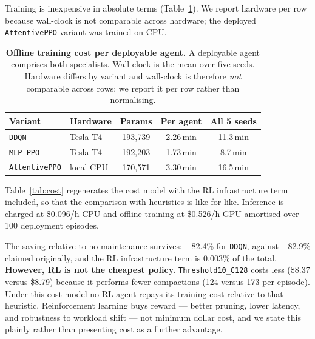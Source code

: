 \documentclass[fleqn,10pt]{wlscirep}
\newcommand{\attentive}{\texttt{AttentivePPO}}
\newcommand{\mlpppo}{\texttt{MLP-PPO}}
\newcommand{\ddqn}{\texttt{DDQN}}
\begin{document}
Training is inexpensive in absolute terms (Table~\ref{tab:training}).
We report hardware per row because wall-clock is not comparable across
hardware; the deployed \attentive{} variant was trained on CPU.

\begin{table}[!htbp]
\centering
\begin{tabular}{llccc}
\toprule
\textbf{Variant} & \textbf{Hardware} & \textbf{Params} &
  \textbf{Per agent} & \textbf{All 5 seeds} \\
\midrule
\ddqn{}       & Tesla T4  & 193{,}739 & 2.26\,min & 11.3\,min \\
\mlpppo{}     & Tesla T4  & 192{,}203 & 1.73\,min & \phantom{0}8.7\,min \\
\attentive{}  & local CPU & 170{,}571 & 3.30\,min & 16.5\,min \\
\bottomrule
\end{tabular}
\caption{\label{tab:training}\textbf{Offline training cost per deployable agent.}
  A deployable agent comprises both specialists. Wall-clock is the mean
  over five seeds. Hardware differs by variant and wall-clock is
  therefore \emph{not} comparable across rows; we report it per row
  rather than normalising.}
\end{table}

Table~\ref{tab:cost} regenerates the cost model with the RL
infrastructure term included, so that the comparison with heuristics is
like-for-like. Inference is charged at \$0.096/h CPU and offline
training at \$0.526/h GPU amortised over 100 deployment episodes.

The saving relative to no maintenance survives: $-$82.4\% for \ddqn{},
against $-$82.9\% claimed originally, and the RL infrastructure term is
0.003\% of the total. \textbf{However, RL is not the cheapest policy.}
\texttt{Threshold10\_C128} costs less (\$8.37 versus \$8.79) because it
performs fewer compactions (124 versus 173 per episode). Under this cost
model no RL agent repays its training cost relative to that heuristic.
Reinforcement learning buys reward --- better pruning, lower latency,
and robustness to workload shift --- not minimum dollar cost, and we
state this plainly rather than presenting cost as a further advantage.
\end{document}
